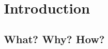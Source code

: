 \documentclass[runningheads,a4paper,11pt]{report}
\begin{document}
\tableofcontents

\newpage

\listofalgorithms

\newpage




\newpage



 


\chapter{Introduction}
\label{chapter:introduction}

\section{What? Why? How?}
\label{section:what}
\end{document}
